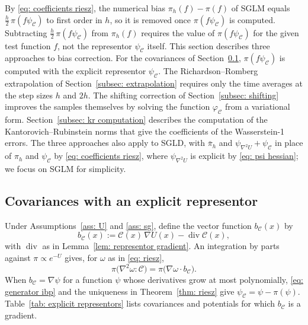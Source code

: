 \documentclass{article}
\numberwithin{equation}{section}
\begin{document}
By \eqref{eq: coefficients riesz}, the numerical bias $\pi_h(f) - \pi(f)$ of SGLM equals $\frac h2\, \pi(f \psi_{\mathcal C})$ to first order in $h$, so it is removed once $\pi(f \psi_{\mathcal C})$ is computed. Subtracting $\frac h2\, \pi(f \psi_{\mathcal C})$ from $\pi_h(f)$ requires the value of $\pi(f \psi_{\mathcal C})$ for the given test function $f$, not the representor $\psi_{\mathcal C}$ itself. This section describes three approaches to bias correction. For the covariances of Section~\ref{subsec: explicit representors}, $\pi(f \psi_{\mathcal C})$ is computed with the explicit representor $\psi_{\mathcal C}$. The Richardson--Romberg extrapolation of Section~\ref{subsec: extrapolation} requires only the time averages at the step sizes $h$ and $2h$. The shifting correction of Section~\ref{subsec: shifting} improves the samples themselves by solving the function $\varphi_{\mathcal C}$ from a variational form. Section~\ref{subsec: kr computation} describes the computation of the Kantorovich--Rubinstein norms that give the coefficients of the Wasserstein-1 errors. The three approaches also apply to SGLD, with $\bar\pi_h$ and $\psi_{\nabla^2 U} + \psi_{\mathcal C}$ in place of $\pi_h$ and $\psi_{\mathcal C}$ by \eqref{eq: coefficients riesz}, where $\psi_{\nabla^2 U}$ is explicit by \eqref{eq: psi hessian}; we focus on SGLM for simplicity.

\subsection{Covariances with an explicit representor}
\label{subsec: explicit representors}

Under Assumptions~\ref{ass: U} and \ref{ass: sg}, define the vector function $b_{\mathcal C}(x)$ by
\begin{equation}
    b_{\mathcal C}(x) := \mathcal C(x)\, \nabla U(x) - \operatorname{div} \mathcal C(x) ,
    \label{eq: representor field}
\end{equation}
with $\operatorname{div}$ as in Lemma~\ref{lem: representor gradient}. An integration by parts against $\pi \propto e^{-U}$ gives, for $\omega$ as in \eqref{eq: riesz},
\begin{equation}
    \pi\bigl( \nabla^2 \omega : \mathcal C \bigr) = \pi\bigl( \nabla \omega \cdot b_{\mathcal C} \bigr) .
    \label{eq: representor ibp}
\end{equation}
When $b_{\mathcal C} = \nabla \psi$ for a function $\psi$ whose derivatives grow at most polynomially, \eqref{eq: generator ibp} and the uniqueness in Theorem~\ref{thm: riesz} give $\psi_{\mathcal C} = \psi - \pi(\psi)$. Table~\ref{tab: explicit representors} lists covariances and potentials for which $b_{\mathcal C}$ is a gradient.
\end{document}
